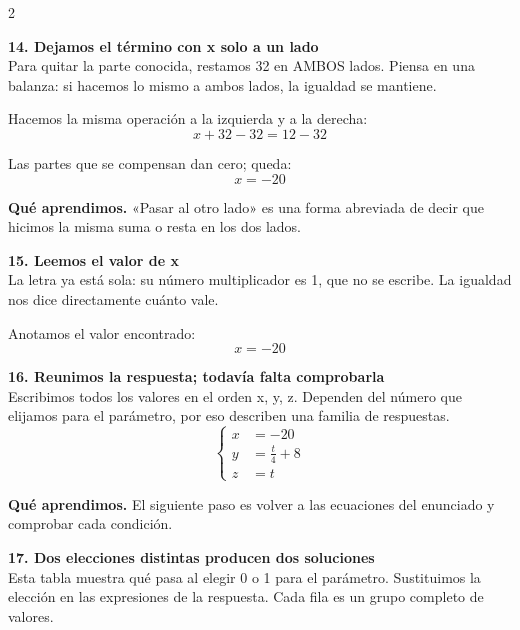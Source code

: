 \documentclass[11pt,a4paper,landscape]{article}
\begin{document}
\begin{multicols*}{2}
\noindent\begin{minipage}{\linewidth}\textbf{14. Dejamos el término con x solo a un lado}\\[2pt]Para quitar la parte conocida, restamos 32 en AMBOS lados. Piensa en una balanza: si hacemos lo mismo a ambos lados, la igualdad se mantiene.
\par\smallskip Hacemos la misma operación a la izquierda y a la derecha:
\[x + 32 - 32=12 - 32\]
\par\smallskip Las partes que se compensan dan cero; queda:
\[x=-20\]
\par\smallskip\textbf{Qué aprendimos.} «Pasar al otro lado» es una forma abreviada de decir que hicimos la misma suma o resta en los dos lados.
\end{minipage}\par\medskip
\noindent\begin{minipage}{\linewidth}\textbf{15. Leemos el valor de x}\\[2pt]La letra ya está sola: su número multiplicador es 1, que no se escribe. La igualdad nos dice directamente cuánto vale.
\par\smallskip Anotamos el valor encontrado:
\[x=-20\]
\end{minipage}\par\medskip
\noindent\begin{minipage}{\linewidth}\textbf{16. Reunimos la respuesta; todavía falta comprobarla}\\[2pt]Escribimos todos los valores en el orden x, y, z. Dependen del número que elijamos para el parámetro, por eso describen una familia de respuestas.
\[\left\{\begin{aligned}x&=-20\\y&=\frac{t}{4} + 8\\z&=t\end{aligned}\right.\]
\par\smallskip\textbf{Qué aprendimos.} El siguiente paso es volver a las ecuaciones del enunciado y comprobar cada condición.
\end{minipage}\par\medskip
\noindent\begin{minipage}{\linewidth}\textbf{17. Dos elecciones distintas producen dos soluciones}\\[2pt]Esta tabla muestra qué pasa al elegir 0 o 1 para el parámetro. Sustituimos la elección en las expresiones de la respuesta. Cada fila es un grupo completo de valores.
\par{}\par\smallskip

\end{minipage}
\end{multicols*}
\end{document}
